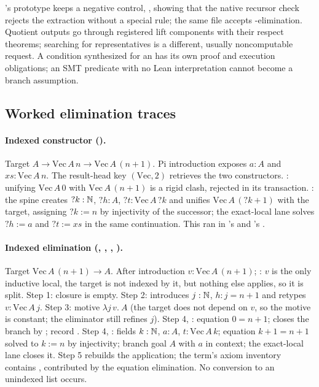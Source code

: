's prototype keeps a negative control, , showing that the native recursor check rejects the extraction without a special rule; the same file accepts -elimination. Quotient outputs go through registered lift components with their respect theorems; searching for representatives is a different, usually noncomputable request. A condition synthesized for an  has its own proof and execution obligations; an SMT predicate with no Lean interpretation cannot become a branch assumption.

\subsection{Worked elimination traces}\label{alg:elim-traces}

\paragraph{Indexed constructor ().} Target $A \to \mathrm{Vec}\,A\,n \to \mathrm{Vec}\,A\,(n+1)$. Pi introduction exposes $a : A$ and $xs : \mathrm{Vec}\,A\,n$. The result-head key $(\mathrm{Vec}, 2)$ retrieves the two constructors.  : unifying $\mathrm{Vec}\,A\,0$ with $\mathrm{Vec}\,A\,(n+1)$ is a rigid clash, rejected in its transaction.  : the spine creates $?k : \mathbb{N}$, $?h : A$, $?t : \mathrm{Vec}\,A\,?k$ and unifies $\mathrm{Vec}\,A\,(?k+1)$ with the target, assigning $?k := n$ by injectivity of the successor; the exact-local lane solves $?h := a$ and $?t := xs$ in the same continuation. This ran in 's  and 's .

\paragraph{Indexed elimination (, , , ).} Target $\mathrm{Vec}\,A\,(n+1) \to A$. After introduction $v : \mathrm{Vec}\,A\,(n+1)$; : $v$ is the only inductive local, the target is not indexed by it, but nothing else applies, so it is split. Step 1: closure is empty. Step 2:  introduces $j : \mathbb{N}$, $h : j = n+1$ and retypes $v : \mathrm{Vec}\,A\,j$. Step 3: motive $\lambda j\, v.\ A$ (the target does not depend on $v$, so the motive is constant; the eliminator still refines $j$). Step 4, : equation $0 = n+1$;  closes the branch by ; record . Step 4, : fields $k : \mathbb{N}$, $a : A$, $t : \mathrm{Vec}\,A\,k$; equation $k+1 = n+1$ solved to $k := n$ by injectivity; branch goal $A$ with $a$ in context; the exact-local lane closes it. Step 5 rebuilds the  application; the term's axiom inventory contains , contributed by the equation elimination. No conversion to an unindexed list occurs.

